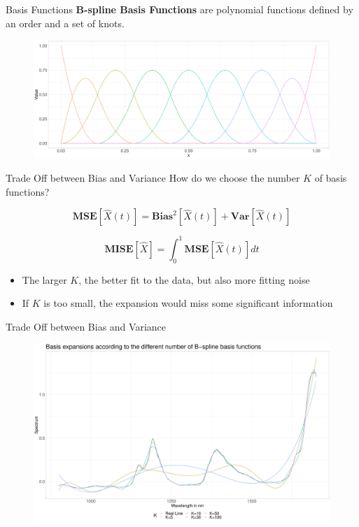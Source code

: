 \documentclass{beamer}
\begin{document}
	\begin{frame}{Basis Functions}
		\textbf{B-spline Basis Functions} are polynomial functions defined by an order and a set of knots.
		\begin{figure}
			\includegraphics[width = \textwidth]{../Graphics/Bspline_Basis.pdf}
		\end{figure}
	\end{frame}
	
	\begin{frame}{Trade Off between Bias and Variance}
		How do we choose the number $K$ of basis functions?
		
		$$\textbf{MSE}[\hat{X}(t)] = \textbf{Bias}^2[\hat{X}(t)] + \textbf{Var}[\hat{X}(t)]$$
		
		$$\textbf{MISE}[\hat{X}] = \int_{0}^{1} \textbf{MSE}[\hat{X}(t)] dt$$
		
		\begin{itemize}
			\item The larger $K$, the better fit to the data, but also more fitting noise
			\item If $K$ is too small, the expansion would miss some significant information
		\end{itemize}
	\end{frame}
	
	\begin{frame}{Trade Off between Bias and Variance}
		\begin{figure}\notag
			\includegraphics[width = \textwidth]{../Graphics/basis_expansions.pdf}
		\end{figure}
	\end{frame}
\end{document}
